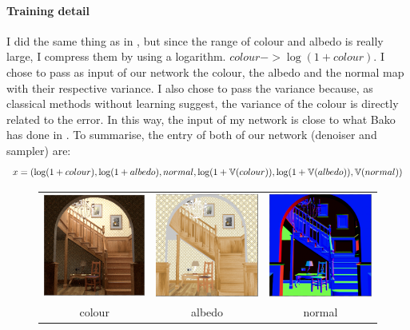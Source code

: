 \documentclass{classeENS}
\begin{document}
\paragraph*{Training detail} I did the same thing as in \cite{kuznetsov2018deep}, but since the range of colour and albedo
is really large, I compress them by using a logarithm. $colour -> \log(1+colour)$. I chose to pass
as input of our network the colour, the albedo and the normal map with their respective variance. I also chose to 
pass the variance because, as classical methods without learning suggest, the variance of 
the colour is directly related to the error. In this way, the input 
of my network is close to what Bako has done in
\cite{10.1145/3072959.3073708}.
To summarise, the entry of both of our network (denoiser and sampler) are:
\[x = (\log(1+colour), \log(1+albedo), normal, \log(1+\mathbb V(colour)), \log(1+\mathbb V(albedo)),  \mathbb V(normal)) \]
\begin{figure}[H]
    \centering
    \begin{tabular}{ccc}
    \includegraphics[width=45mm]{image/networkInput/color.png}
    & \includegraphics[width=45mm]{image/networkInput/albedo.png}
    & \includegraphics[width=45mm]{image/networkInput/normal.png} \\
    colour & albedo & normal\\
\end{tabular}
\end{figure}
\end{document}
